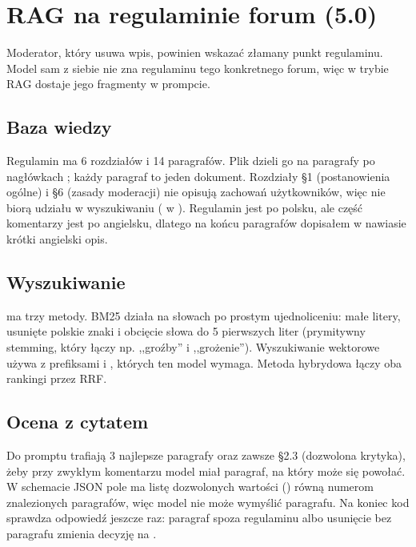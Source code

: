 \newpage
\section{RAG na regulaminie forum (5.0)}
\label{sec:rag}

Moderator, który usuwa wpis, powinien wskazać złamany punkt regulaminu. Model sam z siebie nie zna regulaminu tego
konkretnego forum, więc w trybie RAG dostaje jego fragmenty w prompcie.

\subsection{Baza wiedzy}

Regulamin  ma 6 rozdziałów i 14 paragrafów. Plik  dzieli go na paragrafy
po nagłówkach ; każdy paragraf to jeden dokument. Rozdziały §1 (postanowienia ogólne) i §6 (zasady
moderacji) nie opisują zachowań użytkowników, więc nie biorą udziału w wyszukiwaniu ( w
). Regulamin jest po polsku, ale część komentarzy jest po angielsku, dlatego na końcu paragrafów
dopisałem w nawiasie krótki angielski opis.

\subsection{Wyszukiwanie}

 ma trzy metody. BM25 działa na słowach po prostym ujednoliceniu: małe litery, usunięte polskie znaki
i obcięcie słowa do 5 pierwszych liter (prymitywny stemming, który łączy np. ,,groźby'' i ,,grożenie''). Wyszukiwanie
wektorowe używa  z prefiksami  i , których ten model
wymaga. Metoda hybrydowa łączy oba rankingi przez RRF.


\subsection{Ocena z cytatem}

Do promptu trafiają 3 najlepsze paragrafy oraz zawsze §2.3 (dozwolona krytyka), żeby przy zwykłym komentarzu model
miał paragraf, na który może się powołać. W schemacie JSON pole  ma listę dozwolonych wartości
() równą numerom znalezionych paragrafów, więc model nie może wymyślić paragrafu. Na koniec kod sprawdza
odpowiedź jeszcze raz: paragraf spoza regulaminu albo usunięcie bez paragrafu zmienia decyzję na .

